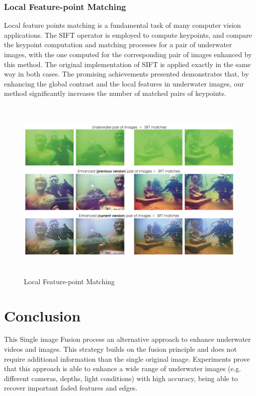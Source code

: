 \documentclass[hidelinks, 12pt]{report}
\begin{document}
\subsection{Local Feature-point Matching}
Local feature points matching is a fundamental task of many computer vision applications. The SIFT operator is employed to compute keypoints, and compare the keypoint computation and matching processes for a pair of underwater images, with the one computed for the corresponding pair of images enhanced by this method. The original implementation of SIFT is applied exactly in the same way in both cases. The promising achievements presented demonstrates that, by enhancing the global contrast and the local features in underwater images, our method significantly increases the number of matched pairs of keypoints.
\begin{figure}[H]
\centering
\includegraphics[width=15cm,height=9cm]{Feature.png}
\caption[Local Feature-point Matching]{Local Feature-point Matching}
\label{Local Feature-point Matching}
\end{figure}

\chapter{Conclusion}
This Single image Fusion process an alternative approach to enhance underwater videos and images. This strategy builds on the fusion principle and does not require additional information than the single original image. Experiments prove that this approach is able to enhance a wide range
of underwater images (e.g. different cameras, depths, light conditions) with high accuracy, being able to recover important faded features and edges.
\end{document}
